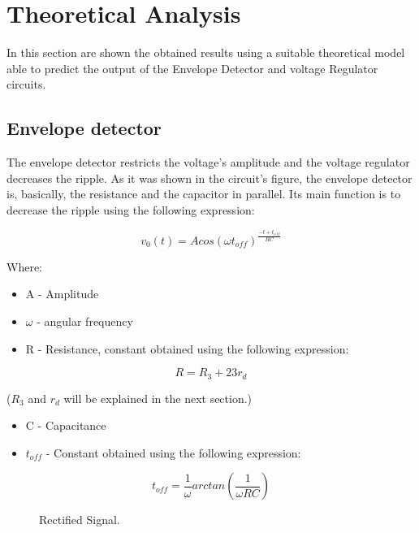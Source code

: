 \section{Theoretical Analysis}
\label{sec:analysis}

In this section are shown the obtained results using a suitable theoretical model able to predict the output of the Envelope Detector and voltage Regulator circuits.

\subsection{Envelope detector}
The envelope detector restricts the voltage's amplitude and the voltage regulator decreases the ripple. As it was shown in the circuit's figure, the envelope detector is, basically, the resistance and the capacitor in parallel. Its main function is to decrease the ripple using the following expression:\par
\begin{equation}
    v_0(t) = Acos(\omega t_{off})^{\frac{-t+t_{off}}{RC}}
\end{equation}\par
Where: \par
\begin{itemize}
  \item A - Amplitude
  \item $\omega$ - angular frequency
  \item R - Resistance, constant obtained using the following expression:
\end{itemize}
\begin{equation}
    R = R_3 + 23r_d 
\end{equation}\par
($R_3$ and $r_d$ will be explained in the next section.)\par
\begin{itemize}
  \item C - Capacitance
  \item $t_{off}$ - Constant obtained using the following expression:
\end{itemize}
\begin{equation}
    t_{off}=\frac{1}{\omega}arctan(\frac{1}{\omega RC})
\end{equation}\par

\begin{figure}[H] \centering
\caption{Rectified Signal.}
\label{fig:rectified}
\end{figure}

